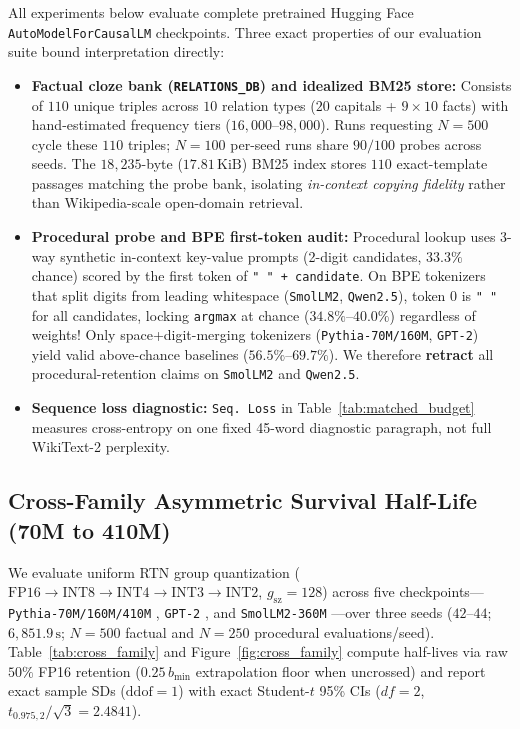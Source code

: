 \documentclass[10pt]{article} %
\begin{document}
All experiments below evaluate complete pretrained Hugging Face \texttt{AutoModelForCausalLM} checkpoints. Three exact properties of our evaluation suite bound interpretation directly:
\begin{itemize}[leftmargin=*,nosep]
    \item \textbf{Factual cloze bank (\texttt{RELATIONS\_DB}) and idealized BM25 store:} Consists of $110$ unique triples across $10$ relation types ($20$ capitals + $9\times 10$ facts) with hand-estimated frequency tiers ($16{,}000$--$98{,}000$). Runs requesting $N=500$ cycle these $110$ triples; $N=100$ per-seed runs share $90/100$ probes across seeds. The $18{,}235$-byte ($17.81\,\text{KiB}$) BM25 index stores $110$ exact-template passages matching the probe bank, isolating \emph{in-context copying fidelity} rather than Wikipedia-scale open-domain retrieval.
    \item \textbf{Procedural probe and BPE first-token audit:} Procedural lookup uses 3-way synthetic in-context key-value prompts (2-digit candidates, $33.3\%$ chance) scored by the first token of \texttt{" " + candidate}. On BPE tokenizers that split digits from leading whitespace (\texttt{SmolLM2}, \texttt{Qwen2.5}), token 0 is \texttt{" "} for all candidates, locking \texttt{argmax} at chance ($34.8\%$--$40.0\%$) regardless of weights! Only space+digit-merging tokenizers (\texttt{Pythia-70M/160M}, \texttt{GPT-2}) yield valid above-chance baselines ($56.5\%$--$69.7\%$). We therefore \textbf{retract} all procedural-retention claims on \texttt{SmolLM2} and \texttt{Qwen2.5}.
    \item \textbf{Sequence loss diagnostic:} \texttt{Seq.\ Loss} in Table~\ref{tab:matched_budget} measures cross-entropy on one fixed 45-word diagnostic paragraph, not full WikiText-2 perplexity.
\end{itemize}

\subsection{Cross-Family Asymmetric Survival Half-Life (70M to 410M)}
\label{sec:cross_family}

We evaluate uniform RTN group quantization ($\text{FP16}\to\text{INT8}\to\text{INT4}\to\text{INT3}\to\text{INT2}$, $g_{\text{sz}}=128$) across five checkpoints---\texttt{Pythia-70M/160M/410M} \citep{biderman2023pythia}, \texttt{GPT-2} \citep{radford2019gpt2}, and \texttt{SmolLM2-360M} \citep{allal2025smollm2}---over three seeds ($42$--$44$; $6{,}851.9\,\text{s}$; $N=500$ factual and $N=250$ procedural evaluations/seed). Table~\ref{tab:cross_family} and Figure~\ref{fig:cross_family} compute half-lives via raw $50\%$ FP16 retention ($0.25\,b_{\min}$ extrapolation floor when uncrossed) and report exact sample SDs ($\mathrm{ddof}=1$) with exact Student-$t$ 95\% CIs ($df=2$, $t_{0.975,2}/\sqrt{3} = 2.4841$).
\end{document}
